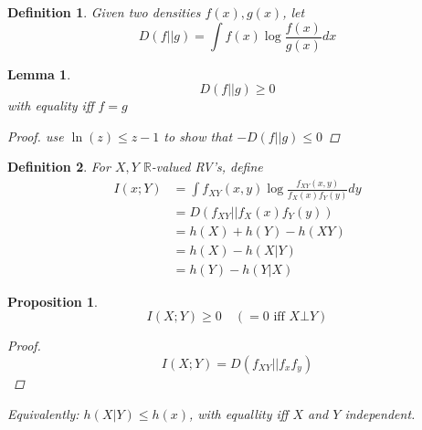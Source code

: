 \documentclass[twoside]{article}
\newtheorem{lemma}[theorem]{Lemma}
\newtheorem{definition}{Definition}[section]
\newtheorem{proposition}{Proposition}[section]
\theoremstyle{definition} %
\def\R{\mathbb{R}}
\begin{document}
\begin{definition}
  Given two densities $f(x), g(x)$, let
  \[
    D(f || g) = \int f(x) \log \frac{f(x)}{g(x)} dx
  \]
\end{definition}

\begin{lemma}
  \[
    D(f || g) \geq 0
  \]
  with equality iff $f = g$
  \begin{proof}
    use $\ln(z) \leq z - 1$ to show that $-D(f||g) \leq 0$
  \end{proof}
\end{lemma}

\begin{definition}
  For $X, Y$ $\R$-valued RV's, define
  \begin{align*}
    I(x ; Y) &= \int f_{XY}(x,y) \log \frac{f_{XY}(x, y)}{f_X(x) f_Y(y)} dy \\
    &= D(f_{XY} || f_X(x) f_Y(y)) \\
    &= h(X) + h(Y) - h(XY) \\
    &= h(X) - h(X | Y) \\
    &= h(Y) - h(Y | X)
  \end{align*}
\end{definition}

\begin{proposition}
  \[
    I(X ; Y) \geq 0 \quad (=0 \text{ iff } X \bot Y)
  \]
  \begin{proof}
    \[
      I(X ; Y) = D(f_{XY} || f_x f_y)
    \]
  \end{proof}
  \textit{Equivalently}: $h(X | Y) \leq h(x)$, with equallity iff $X$ and $Y$ independent.
\end{proposition}
\end{document}
